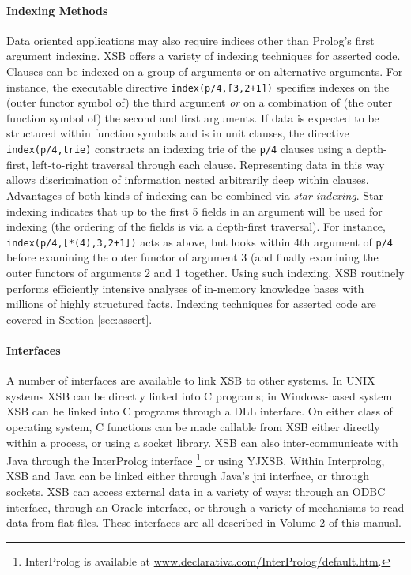 
\paragraph{Indexing Methods} Data oriented applications may also
require indices other than Prolog's first argument indexing.  XSB
offers a variety of indexing techniques for asserted code.  Clauses
can be indexed on a group of arguments or on alternative arguments.
For instance, the executable directive {\tt index(p/4,[3,2+1])}
specifies indexes on the (outer functor symbol of) the third argument
{\em or} on a combination of (the outer function symbol of) the second
and first arguments.  If data is expected to be structured within
function symbols and is in unit clauses, the directive {\tt
  index(p/4,trie)} constructs an indexing trie of the {\tt p/4}
clauses using a depth-first, left-to-right traversal through each
clause.  Representing data in this way allows discrimination of
information nested arbitrarily deep within clauses.  Advantages of
both kinds of indexing can be combined via {\em star-indexing}.
Star-indexing indicates that up to the first 5 fields in an argument
will be used for indexing (the ordering of the fields is via a
depth-first traversal).  For instance, {\tt index(p/4,[*(4),3,2+1])}
acts as above, but looks within 4th argument of {\tt p/4} before
examining the outer functor of argument 3 (and finally examining the
outer functors of arguments 2 and 1 together.  Using such indexing, XSB
routinely performs efficiently intensive analyses of in-memory
knowledge bases with millions of highly structured facts.  Indexing
techniques for asserted code are covered in Section \ref{sec:assert}.

 
\paragraph{Interfaces} A number of interfaces are available to link XSB
to other systems.  In UNIX systems XSB can be directly linked into C
programs; in Windows-based system XSB can be linked into C programs
through a DLL interface.  On either class of operating system, C
functions can be made callable from XSB either directly within a
process, or using a socket library.  XSB can also inter-communicate
with Java through the InterProlog interface \footnote{InterProlog is 
available at \url{www.declarativa.com/InterProlog/default.htm}.} or
using YJXSB.  Within Interprolog, XSB and Java can be linked either through
Java's jni interface, or through sockets.  XSB can access external
data in a variety of ways: through an ODBC interface, through an
Oracle interface, or through a variety of mechanisms to read data from
flat files.  These interfaces are all described in Volume 2 of this
manual.


